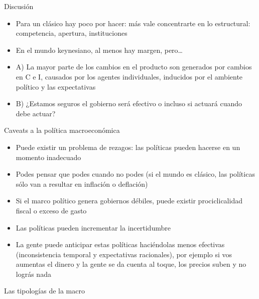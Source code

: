 \documentclass{beamer}
\begin{document}
\begin{frame}{Discusión}

    \begin{itemize}
    \item Para un clásico hay poco por hacer: más vale concentrarte en lo estructural: competencia, apertura, instituciones
    \item En el mundo keynesiano, al menos hay margen, pero…
    \item A) La mayor parte de los cambios en el producto son generados por cambios en C e I, causados por los agentes individuales, inducidos por el ambiente político y las expectativas
    \item B) ¿Estamos seguros el gobierno será efectivo o incluso si actuará cuando debe actuar? 
    \end{itemize}

\end{frame}


\begin{frame}{Caveats a la política macroeconómica}

    \begin{itemize}
    \item Puede existir un problema de rezagos: las políticas pueden hacerse en un momento inadecuado
    \item Podes pensar que podes cuando no podes (si el mundo es clásico, las políticas sólo van a resultar en inflación o deflación)
    \item Si el marco político genera gobiernos débiles, puede existir prociclicalidad fiscal o exceso de gasto
    \item Las políticas pueden incrementar la incertidumbre
    \item La gente puede anticipar estas políticas haciéndolas menos efectivas (inconsistencia temporal y expectativas racionales), por ejemplo si vos aumentas el dinero y la gente se da cuenta al toque, los precios suben y no lográs nada
    \end{itemize}

\end{frame}
\begin{frame}{Las tipologías de la macro}
\begin{table}[]
\end{table}

\end{frame}
\end{document}
